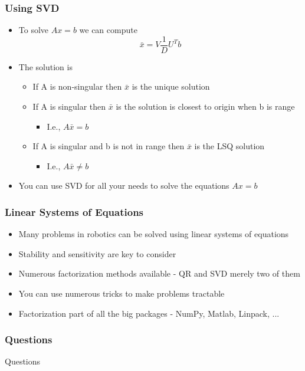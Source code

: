 \documentclass[10pt]{beamer}
\begin{document}
\begin{frame}
  \frametitle{Using SVD}
  \begin{itemize}
  \item To solve $A x = b$ we can compute
    \[
      \bar{x} = V \frac{1}{D} U^T b
    \]
  \item The solution is
    \begin{itemize}
    \item If A is non-singular then $\bar{x}$ is the unique solution
      \item If A is singular then $\bar{x}$ is the solution is closest to origin when b is range
            \begin{itemize}
              \item I.e., $A \bar{x} = b $
            \end{itemize}
      \item If A is singular and b is not in range then $\bar{x}$ is the LSQ solution
            \begin{itemize}
              \item I.e., $A \bar{x} \neq b $
            \end{itemize}
    \end{itemize}
  \item You can use SVD for all your needs to solve the equations $A x = b$
  \end{itemize}
\end{frame}

\begin{frame}
  \frametitle{Linear Systems of Equations}
  \begin{itemize}
  \item Many problems in robotics can be solved using linear systems of equations
  \item Stability and sensitivity are key to consider
  \item Numerous factorization methods available - QR and SVD merely two of them
  \item You can use numerous tricks to make problems tractable
  \item Factorization part of all the big packages - NumPy, Matlab, Linpack, ... 
  \end{itemize}
\end{frame}

\begin{frame}
  \frametitle{Questions}
  \centerline{\Huge Questions}
\end{frame}
\end{document}
